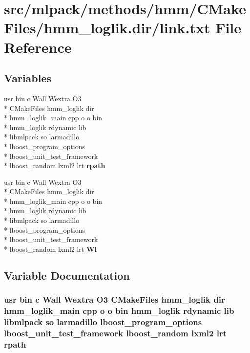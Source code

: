 \section{src/mlpack/methods/hmm/\-C\-Make\-Files/hmm\-\_\-loglik.dir/link.txt File Reference}
\label{methods_2hmm_2CMakeFiles_2hmm__loglik_8dir_2link_8txt}
\subsection*{Variables}
\begin{DoxyCompactItemize}
\item 
usr bin c Wall Wextra O3 \\*
C\-Make\-Files hmm\-\_\-loglik dir \\*
hmm\-\_\-loglik\-\_\-main cpp o o bin \\*
hmm\-\_\-loglik rdynamic lib \\*
libmlpack so larmadillo \\*
lboost\-\_\-program\-\_\-options \\*
lboost\-\_\-unit\-\_\-test\-\_\-framework \\*
lboost\-\_\-random lxml2 lrt {\bf rpath}
\item 
usr bin c Wall Wextra O3 \\*
C\-Make\-Files hmm\-\_\-loglik dir \\*
hmm\-\_\-loglik\-\_\-main cpp o o bin \\*
hmm\-\_\-loglik rdynamic lib \\*
libmlpack so larmadillo \\*
lboost\-\_\-program\-\_\-options \\*
lboost\-\_\-unit\-\_\-test\-\_\-framework \\*
lboost\-\_\-random lxml2 lrt {\bf Wl}
\end{DoxyCompactItemize}


\subsection{Variable Documentation}
\subsubsection[{rpath}]{\setlength{\rightskip}{0pt plus 5cm}usr bin c Wall Wextra O3 C\-Make\-Files hmm\-\_\-loglik dir hmm\-\_\-loglik\-\_\-main cpp o o bin hmm\-\_\-loglik rdynamic lib libmlpack so larmadillo lboost\-\_\-program\-\_\-options lboost\-\_\-unit\-\_\-test\-\_\-framework lboost\-\_\-random lxml2 lrt rpath}\label{methods_2hmm_2CMakeFiles_2hmm__loglik_8dir_2link_8txt_a2adde995eb67af164418863dfa0007ab}


